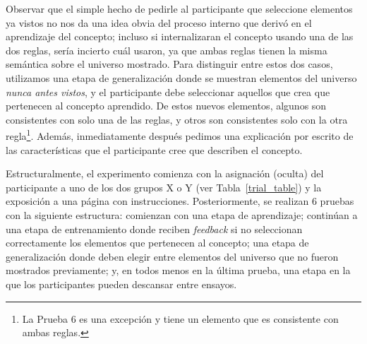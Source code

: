 Observar que el simple hecho de pedirle al participante que seleccione elementos ya vistos no nos da una idea obvia del proceso interno que derivó en el aprendizaje del concepto; incluso si internalizaran el concepto usando una de las dos reglas, sería incierto cuál usaron, ya que ambas reglas tienen la misma semántica sobre el universo mostrado. Para distinguir entre estos dos casos, utilizamos una etapa de generalización donde se muestran elementos del universo {\em nunca antes vistos}, y el participante debe seleccionar aquellos que crea que pertenecen al concepto aprendido. De estos nuevos elementos, algunos son consistentes con solo una de las reglas, y otros son consistentes solo con la otra regla\footnote{La Prueba 6 es una excepción y tiene un elemento que es consistente con ambas reglas.}. Además, inmediatamente después pedimos una explicación por escrito de las características que el participante cree que describen el concepto.

Estructuralmente, el experimento comienza con la asignación (oculta) del participante a uno de los dos grupos X o Y (ver Tabla~\ref{trial_table}) y la exposición a una página con instrucciones.
Posteriormente, se realizan 6 pruebas con la siguiente estructura: comienzan con una etapa de aprendizaje; continúan a una etapa de entrenamiento donde reciben {\em feedback} si no seleccionan correctamente los elementos que pertenecen al concepto; una etapa de generalización donde deben elegir entre elementos del universo que no fueron mostrados previamente; y, en todos menos en la última prueba, una etapa en la que los participantes pueden descansar entre ensayos.

